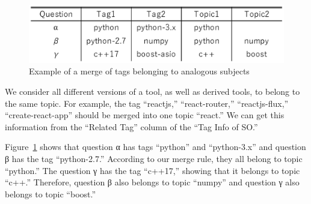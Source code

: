 \documentclass[conference]{IEEEtran}
\begin{document}
\begin{figure}[t]
 \centering
 \includegraphics[width=1.0\hsize]{img/ff2.eps}  
 \caption{Example of a merge of tags belonging to analogous subjects} 
 \label{fig:example2} 
\end{figure}

We consider all different versions of a tool, as well as derived tools, to belong to the same topic. For example, the tag ``reactjs,'' ``react-router,'' ``reactjs-flux,'' ``create-react-app'' should be merged into one topic ``react.'' We can get this information from the “Related Tag” column of the ``Tag Info of SO.''

Figure~\ref{fig:example2} shows that question α has tags ``python'' and ``python-3.x'' and question β has the tag ``python-2.7.'' According to our merge rule, they all belong to topic ``python.'' The question γ has the tag ``c++17,'' showing that it belongs to topic ``c++.'' Therefore, question β also belongs to topic ``numpy'' and question γ also belongs to topic ``boost.''
\end{document}
